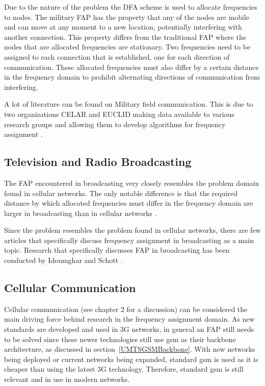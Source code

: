 Due to the nature of the problem the \gls{DFA} scheme is used to allocate frequencies to nodes. The military \gls{FAP} has the property that any of the nodes are mobile and can move at any moment to a new location, potentially interfering with another connection\cite{CALMA,DynamicFAP}. This property differs from the traditional \gls{FAP} where the nodes that are allocated frequencies are stationary\cite{CALMA}. Two frequencies need to be assigned to each connection that is established, one for each direction of communication. These allocated frequencies must also differ by a certain distance in the frequency domain to prohibit alternating directions of communication from interfering\cite{CALMA,DynamicFAP}.

A lot of literature can be found on Military field communication. This is due to two organizations CELAR and \gls{EUCLID} making data available to various research groups and allowing them to develop algorithms for frequency assignment \cite{CALMA,DynamicFAP}. 

\subsection{Television and Radio Broadcasting}
The \gls{FAP} encountered in broadcasting very closely resembles the problem domain found in cellular networks\cite{Karen2004}. The only notable difference is that the required distance by which allocated frequencies must differ in the frequency domain are larger in broadcasting than in cellular networks \cite{Karen2004}.

Since the problem resembles the problem found in cellular networks, there are few articles that specifically discuss frequency assignment in broadcasting as a main topic. Research that specifically discusses \gls{FAP} in broadcasting has been conducted by Idoumghar and Schott \cite{RadioFAP}.
\subsection{Cellular Communication}
Cellular communication (see chapter 2 for a discussion) can be considered the main driving force behind research in the frequency assignment domain. As new standards are developed and used in 3G networks, in general an \gls{FAP} still needs to be solved since these newer technologies still use \gls{gsm} as their backbone architecture, as discussed in section~\ref{UMTSGSMBackbone}. With new networks being deployed or current networks being expanded, standard \gls{gsm} is used as it is cheaper than using the latest 3G technology. Therefore, standard \gls{gsm} is still relevant and in use in modern networks.

